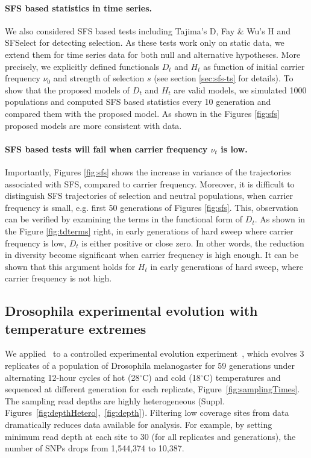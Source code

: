 \documentclass[11pt]{article}
\def\comale{\text{{\sc Comale}}}
\begin{document}
\paragraph{SFS based statistics in time series.} 
We also considered SFS based tests including Tajima's D, Fay \& Wu's H and 
SFSelect for detecting selection. 
As these tests work only on static data, we extend them for time series data 
for both null and alternative hypotheses.
More precisely, we explicitly defined functionals $D_t$ and $H_t$ as function 
of initial carrier frequency $\nu_0$ and strength of selection $s$ (see section 
\ref{sec:sfs-ts} for details).
 To show that the proposed models of $D_t$ and $H_t$ are valid models, we 
 simulated 1000 populations and computed SFS based statistics every 10 
 generation and compared them with the proposed model.
 As shown in the Figures \ref{fig:sfs} proposed models are more consistent with data.

 \paragraph{SFS based tests will fail when carrier frequency $\nu_t$
   is low.} 
 Importantly, Figures \ref{fig:sfs} shows the increase in variance of
 the trajectories associated with SFS, compared to carrier
 frequency. Moreover, it is difficult to distinguish SFS trajectories
 of selection and neutral populations, when carrier frequency is
 small, e.g. first 50 generations of Figures \ref{fig:sfs}.  This,
 observation can be verified by examining the terms in the functional
 form of $D_t$.  As shown in the Figure \ref{fig:tdterms} right, in
 early generations of hard sweep where carrier frequency is low, $D_t$
 is either positive or close zero. In other words, the reduction in
 diversity become significant when carrier frequency is high enough.
 It can be shown that this argument holds for $H_t$ in early
 generations of hard sweep, where carrier frequency is not high.




\subsection{Drosophila experimental evolution with temperature extremes}
We applied \comale\ to a controlled experimental evolution
experiment~\cite{orozco2012adaptation}, which evolves 3 replicates of
a population of Drosophila melanogaster for 59 generations under
alternating 12-hour cycles of hot (28$^{\circ}$C) and cold
(18$^{\circ}$C) temperatures and sequenced at different generation for
each replicate, Figure~\ref{fig:samplingTimes}. The sampling read
depths are highly heterogeneous
(Suppl. Figures~\ref{fig:depthHetero},~\ref{fig:depth}). Filtering low
coverage sites from data dramatically reduces data available for
analysis. For example, by setting minimum read depth at each site
to 30 (for all replicates and generations),
the number of SNPs drops from 1,544,374 to 10,387.
\end{document}
